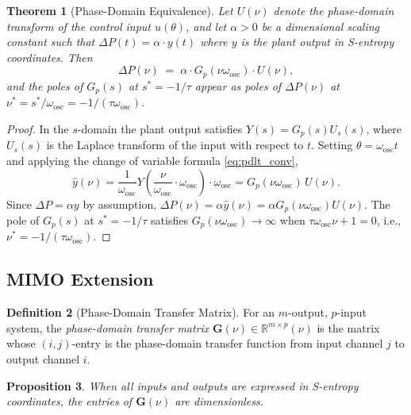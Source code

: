 \documentclass[10pt,twocolumn]{article}
\theoremstyle{plain}
\newtheorem{theorem}{Theorem}[section]
\newtheorem{proposition}[theorem]{Proposition}
\theoremstyle{definition}
\newtheorem{definition}[theorem]{Definition}
\theoremstyle{remark}
\newcommand{\R}{\mathbb{R}}
\newcommand{\DeltaP}{\Delta P}
\newcommand{\omegaosc}{\omega_{\mathrm{osc}}}
\begin{document}
\begin{theorem}[Phase-Domain Equivalence]
\label{thm:pde}
Let $U(\nu)$ denote the phase-domain transform of the control input
$u(\theta)$, and let $\alpha > 0$ be a dimensional scaling constant
such that $\DeltaP(t) = \alpha \cdot y(t)$ where $y$ is the plant
output in S-entropy coordinates.  Then
\begin{equation}
  \DeltaP(\nu) \;=\; \alpha \cdot G_p(\nu\omegaosc) \cdot U(\nu),
  \label{eq:pde}
\end{equation}
and the poles of $G_p(s)$ at $s^* = -1/\tau$ appear as poles of
$\DeltaP(\nu)$ at $\nu^* = s^*/\omegaosc = -1/(\tau\omegaosc)$.
\end{theorem}

\begin{proof}
In the $s$-domain the plant output satisfies $Y(s) = G_p(s) U_s(s)$,
where $U_s(s)$ is the Laplace transform of the input with respect to
$t$.  Setting $\theta = \omegaosc t$ and applying the change of variable
formula \eqref{eq:pdlt_conv},
\begin{equation}
  \hat{y}(\nu) = \frac{1}{\omegaosc} Y\!\left(\frac{\nu}{\omegaosc}
                 \cdot \omegaosc\right) \cdot \omegaosc
               = G_p(\nu\omegaosc)\,U(\nu).
  \label{eq:pde_proof}
\end{equation}
Since $\DeltaP = \alpha y$ by assumption, $\DeltaP(\nu)
= \alpha \hat{y}(\nu) = \alpha G_p(\nu\omegaosc) U(\nu)$.
The pole of $G_p(s)$ at $s^* = -1/\tau$ satisfies
$G_p(\nu\omegaosc) \to \infty$ when
$\tau\omegaosc\nu + 1 = 0$, i.e., $\nu^* = -1/(\tau\omegaosc)$.
\end{proof}

\subsection{MIMO Extension}
\label{ssec:mimo}

\begin{definition}[Phase-Domain Transfer Matrix]
\label{def:pdtm}
For an $m$-output, $p$-input system, the \emph{phase-domain transfer
matrix} $\mathbf{G}(\nu) \in \R^{m \times p}(\nu)$ is the matrix
whose $(i,j)$-entry is the phase-domain transfer function from input
channel $j$ to output channel $i$.
\end{definition}

\begin{proposition}
\label{prop:dimensionless}
When all inputs and outputs are expressed in S-entropy coordinates,
the entries of $\mathbf{G}(\nu)$ are dimensionless.
\end{proposition}
\end{document}
